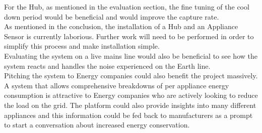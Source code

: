 \documentclass[preprint,12pt,3p]{elsarticle}
\begin{document}
For the Hub, as mentioned in the evaluation section, the fine tuning of the cool down period would be beneficial and would improve the capture rate.\\
As mentioned in the conclusion, the installation of a Hub and an Appliance Sensor is currently laborious. Further work will need to be performed in order to simplify this process and make installation simple.\\
Evaluating the system on a live mains line would also be beneficial to see how the system reacts and handles the noise experienced on the Earth line.\\
Pitching the system to Energy companies could also benefit the project massively. A system that allows comprehensive breakdowns of per appliance energy consumption is attractive to Energy companies who are actively looking to reduce the load on the grid. The platform could also provide insights into many different appliances and this information could be fed back to manufacturers as a prompt to start a conversation about increased energy conservation.\\

\clearpage

{}
\end{document}

